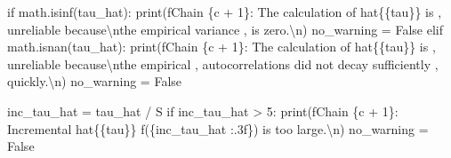 \documentclass[
  letterpaper,
  DIV=11,
  numbers=noendperiod]{scrartcl}
\newenvironment{Shaded}{\begin{snugshade}}{\end{snugshade}}
\newcommand{\BuiltInTok}[1]{\textcolor[rgb]{0.00,0.23,0.31}{#1}}
\newcommand{\CharTok}[1]{\textcolor[rgb]{0.13,0.47,0.30}{#1}}
\newcommand{\ControlFlowTok}[1]{\textcolor[rgb]{0.00,0.23,0.31}{#1}}
\newcommand{\DecValTok}[1]{\textcolor[rgb]{0.68,0.00,0.00}{#1}}
\newcommand{\NormalTok}[1]{\textcolor[rgb]{0.00,0.23,0.31}{#1}}
\newcommand{\OperatorTok}[1]{\textcolor[rgb]{0.37,0.37,0.37}{#1}}
\newcommand{\SpecialCharTok}[1]{\textcolor[rgb]{0.37,0.37,0.37}{#1}}
\newcommand{\SpecialStringTok}[1]{\textcolor[rgb]{0.13,0.47,0.30}{#1}}
\newcommand{\StringTok}[1]{\textcolor[rgb]{0.13,0.47,0.30}{#1}}
\newcommand{\VariableTok}[1]{\textcolor[rgb]{0.07,0.07,0.07}{#1}}
\begin{document}
\begin{Shaded}
\begin{Highlighting}[]
    \ControlFlowTok{if}\NormalTok{ math.isinf(tau\_hat):}
      \BuiltInTok{print}\NormalTok{(}\SpecialStringTok{f\textquotesingle{}Chain }\SpecialCharTok{\{}\NormalTok{c }\OperatorTok{+} \DecValTok{1}\SpecialCharTok{\}}\SpecialStringTok{: The calculation of hat}\CharTok{\{\{}\SpecialStringTok{tau}\CharTok{\}\}}\SpecialStringTok{ is \textquotesingle{}}\NormalTok{,}
             \StringTok{\textquotesingle{}unreliable because}\CharTok{\textbackslash{}n}\StringTok{the empirical variance \textquotesingle{}}\NormalTok{,}
             \StringTok{\textquotesingle{}is zero.}\CharTok{\textbackslash{}n}\StringTok{\textquotesingle{}}\NormalTok{)}
\NormalTok{      no\_warning }\OperatorTok{=} \VariableTok{False}
    \ControlFlowTok{elif}\NormalTok{ math.isnan(tau\_hat):}
      \BuiltInTok{print}\NormalTok{(}\SpecialStringTok{f\textquotesingle{}Chain }\SpecialCharTok{\{}\NormalTok{c }\OperatorTok{+} \DecValTok{1}\SpecialCharTok{\}}\SpecialStringTok{: The calculation of hat}\CharTok{\{\{}\SpecialStringTok{tau}\CharTok{\}\}}\SpecialStringTok{ is \textquotesingle{}}\NormalTok{,}
             \StringTok{\textquotesingle{}unreliable because}\CharTok{\textbackslash{}n}\StringTok{the empirical \textquotesingle{}}\NormalTok{,}
             \StringTok{\textquotesingle{}autocorrelations did not decay sufficiently \textquotesingle{}}\NormalTok{,}
             \StringTok{\textquotesingle{}quickly.}\CharTok{\textbackslash{}n}\StringTok{\textquotesingle{}}\NormalTok{)}
\NormalTok{      no\_warning }\OperatorTok{=} \VariableTok{False}

\NormalTok{    inc\_tau\_hat }\OperatorTok{=}\NormalTok{ tau\_hat }\OperatorTok{/}\NormalTok{ S}
    \ControlFlowTok{if}\NormalTok{ inc\_tau\_hat }\OperatorTok{\textgreater{}} \DecValTok{5}\NormalTok{:}
      \BuiltInTok{print}\NormalTok{(}\SpecialStringTok{f\textquotesingle{}Chain }\SpecialCharTok{\{}\NormalTok{c }\OperatorTok{+} \DecValTok{1}\SpecialCharTok{\}}\SpecialStringTok{: Incremental hat}\CharTok{\{\{}\SpecialStringTok{tau}\CharTok{\}\}}\SpecialStringTok{ \textquotesingle{}}
            \SpecialStringTok{f\textquotesingle{}(}\SpecialCharTok{\{}\NormalTok{inc\_tau\_hat }\SpecialCharTok{:.3f\}}\SpecialStringTok{) is too large.}\CharTok{\textbackslash{}n}\SpecialStringTok{\textquotesingle{}}\NormalTok{)}
\NormalTok{      no\_warning }\OperatorTok{=} \VariableTok{False}


\end{Highlighting}
\end{Shaded}
\end{document}
